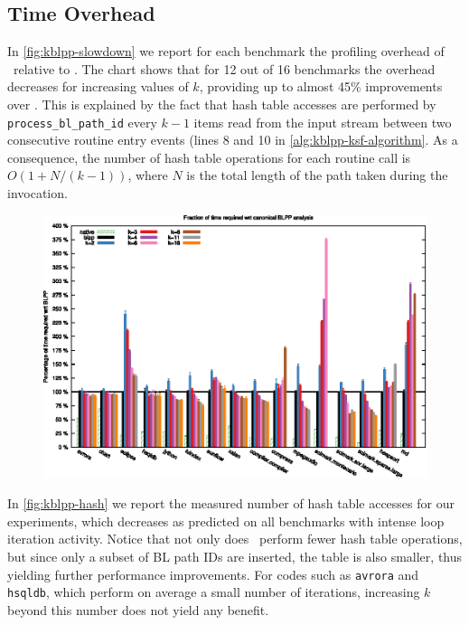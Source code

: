 \subsection{Time Overhead}
\label{ss:eval-kblpp-time}

In \myfigure\ref{fig:kblpp-slowdown} we report for each benchmark the profiling overhead of \kblpp\ relative to \blpp. The chart shows that for 12 out of 16 benchmarks the overhead decreases for increasing values of $k$, providing up to almost 45\% improvements over \blpp. This is explained by the fact that hash table accesses are performed by {\tt process\_bl\_path\_id} every $k-1$ items read from the input stream between two consecutive routine entry events (lines 8 and 10 in \myalgorithm\ref{alg:kblpp-ksf-algorithm}. As a consequence, the number of hash table operations for each routine call is $O(1+N/(k-1))$, where $N$ is the total length of the path taken during the invocation.

\ifdefined\noauthorea
\begin{figure}[!ht]
\begin{center}
\includegraphics[width=\textwidth]{figures/kblpp-slowdown/kblpp-slowdown.eps}
\caption{\protect}
\end{center}
\end{figure}
\fi

In \myfigure\ref{fig:kblpp-hash} we report the measured number of hash table accesses for our experiments, which decreases as predicted on all benchmarks with intense loop iteration activity. Notice that not only does \kblpp\ perform fewer hash table operations, but since only a subset of BL path IDs are inserted, the table is also smaller, thus yielding further performance improvements. For codes such as {\tt avrora} and {\tt hsqldb}, which perform on average a small number of iterations, increasing $k$ beyond this number does not yield any benefit.

